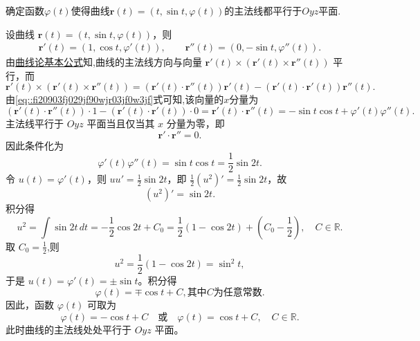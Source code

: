 \documentclass[../../main.tex]{subfiles}%
\begin{document}
\begin{example}
确定函数$\varphi(t)$使得曲线$\bm{r}(t) = (t, \sin t, \varphi(t))$的主法线都平行于$Oyz$平面.
\end{example}
\begin{solution}
设曲线 $\bm{r}(t) = (t, \sin t, \varphi(t))$，则
\begin{align}
\bm{r}'(t) = (1, \cos t, \varphi'(t)), \qquad 
\bm{r}''(t) = (0, -\sin t, \varphi''(t)).\label{eq::fi20903fj029jf90wjr03jf0w3jf}
\end{align}
由\hyperref[theorem:曲线论基本公式]{曲线论基本公式}知,曲线的主法线方向与向量 $\bm{r}'(t) \times (\bm{r}'(t) \times \bm{r}''(t))$ 平行，而
\[
\bm{r}'(t) \times (\bm{r}'(t) \times \bm{r}''(t)) = (\bm{r}'(t)\cdot\bm{r}''(t))\bm{r}'(t) - (\bm{r}'(t)\cdot\bm{r}'(t))\bm{r}''(t).
\]
由\eqref{eq::fi20903fj029jf90wjr03jf0w3jf}式可知,该向量的$x$分量为
\[
(\bm{r}'(t)\cdot\bm{r}''(t)) \cdot 1 - (\bm{r}'(t)\cdot\bm{r}'(t)) \cdot 0 = \bm{r}'(t)\cdot\bm{r}''(t)= -\sin t\cos t + \varphi'(t)\varphi''(t).
\]
主法线平行于 $Oyz$ 平面当且仅当其 $x$ 分量为零，即
\[
\bm{r}'\cdot\bm{r}'' = 0.
\]
因此条件化为
\[
\varphi'(t)\varphi''(t) = \sin t\cos t = \frac{1}{2}\sin 2t.
\]
令 $u(t) = \varphi'(t)$，则 $u u' = \frac{1}{2}\sin 2t$，即 $\frac{1}{2}(u^2)' = \frac{1}{2}\sin 2t$，故
\[
(u^2)' = \sin 2t.
\]
积分得
\[
u^2 = \int \sin 2t\,dt = -\frac{1}{2}\cos 2t + C_0 = \frac{1}{2}(1 - \cos 2t) + \left(C_0 - \frac{1}{2}\right),\quad C\in \mathbb{R}.
\]
取 $C_0 = \frac{1}{2}$,则
\[
u^2 = \frac{1}{2}(1 - \cos 2t) = \sin^2 t,
\]
于是 $u(t) = \varphi'(t) = \pm \sin t$。积分得
\[
\varphi(t) = \mp \cos t + C,\text{其中}C\text{为任意常数}.
\]
因此，函数 $\varphi(t)$ 可取为
\[
\varphi(t) = -\cos t + C \quad\text{或}\quad \varphi(t) = \cos t + C,\quad C\in\mathbb{R}.
\]
此时曲线的主法线处处平行于 $Oyz$ 平面。

\end{solution}
\end{document}
